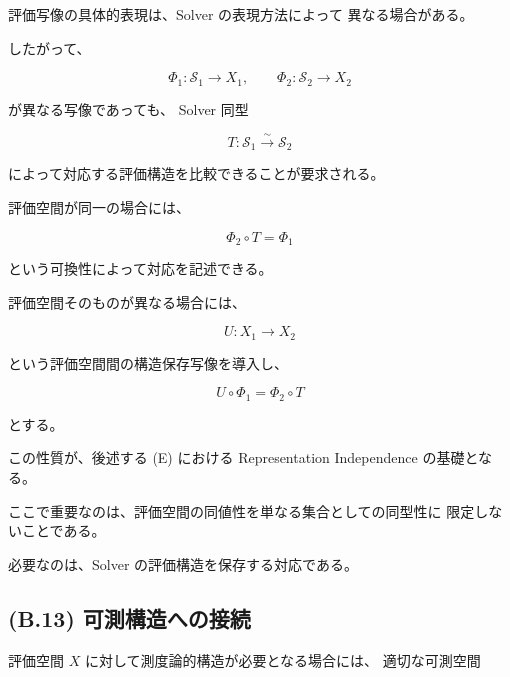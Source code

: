 \documentclass[a4paper,11pt]{article}
\newcommand{\Solver}{\mathcal{S}}
\begin{document}
評価写像の具体的表現は、Solver の表現方法によって
異なる場合がある。

したがって、

\begin{equation}
    \Phi_1:
    \Solver_1
    \longrightarrow
    X_1,
    \qquad
    \Phi_2:
    \Solver_2
    \longrightarrow
    X_2
\end{equation}

が異なる写像であっても、
Solver 同型

\begin{equation}
    T:
    \Solver_1
    \overset{\sim}{\longrightarrow}
    \Solver_2
\end{equation}

によって対応する評価構造を比較できることが要求される。

評価空間が同一の場合には、

\begin{equation}
    \boxed{
        \Phi_2\circ T
        =
        \Phi_1
    }
    \label{eq:B-representation-independence}
\end{equation}

という可換性によって対応を記述できる。

評価空間そのものが異なる場合には、

\begin{equation}
    U:
    X_1
    \longrightarrow
    X_2
\end{equation}

という評価空間間の構造保存写像を導入し、

\begin{equation}
    \boxed{
        U\circ\Phi_1
        =
        \Phi_2\circ T
    }
    \label{eq:B-evaluation-space-correspondence}
\end{equation}

とする。

この性質が、後述する (E) における
Representation Independence の基礎となる。

ここで重要なのは、評価空間の同値性を単なる集合としての同型性に
限定しないことである。

必要なのは、Solver の評価構造を保存する対応である。


\subsection{(B.13) 可測構造への接続}
\label{subsec:B13}

評価空間 $X$ に対して測度論的構造が必要となる場合には、
適切な可測空間
\end{document}
